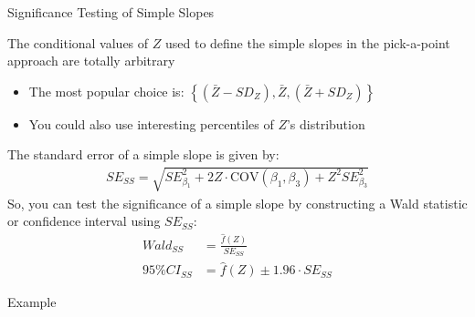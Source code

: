 \documentclass{beamer}
\newcommand{\va}[0]{\vspace{12pt}}
\newcommand{\vb}[0]{\vspace{6pt}}
\newcommand{\vc}[0]{\vspace{3pt}}
\begin{document}
\begin{frame}{Significance Testing of Simple Slopes}

  The conditional values of $Z$ used to define the simple slopes in
  the pick-a-point approach are totally arbitrary
  \vb
  \begin{itemize}
  \item The most popular choice is: $\left\{ (\bar{Z} - SD_Z), \bar{Z},
    (\bar{Z} + SD_Z) \right\}$
    \vc
  \item You could also use interesting percentiles of $Z$'s
    distribution
  \end{itemize}
  \va
  The standard error of a simple slope is given by:
  \begin{align}
    SE_{SS} = \sqrt{SE_{\beta_1}^2 + 2Z \cdot \text{COV}(\beta_1, \beta_3) + Z^2 SE_{\beta_3}^2}
  \end{align}
  So, you can test the significance of a simple slope by constructing
  a Wald statistic or confidence interval using $SE_{SS}$:
  \begin{align*}
    Wald_{SS} &= \frac{\hat{f}(Z)}{SE_{SS}}\\
    95\% CI_{SS} &= \hat{f}(Z) \pm 1.96 \cdot SE_{SS}
  \end{align*}

\end{frame}


\begin{frame}[allowframebreaks]{Example}


\pagebreak

\pagebreak


\end{frame}
\end{document}
